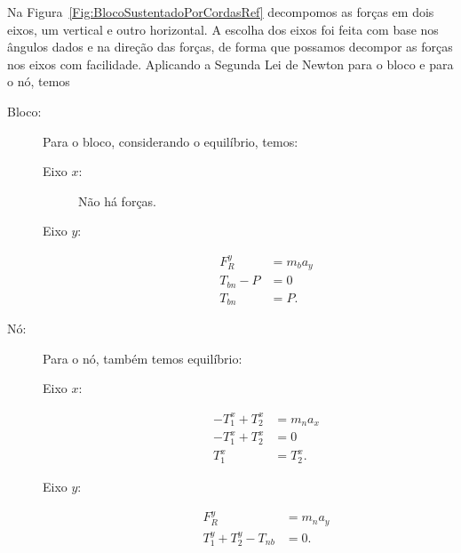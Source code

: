 Na Figura~\ref{Fig:BlocoSustentadoPorCordasRef} decompomos as forças em dois eixos, um vertical e outro horizontal. A escolha dos eixos foi feita com base nos ângulos dados e na direção das forças, de forma que possamos decompor as forças nos eixos com facilidade. Aplicando a Segunda Lei de Newton para o bloco e para o nó, temos
\begin{description}
    \item[Bloco:] Para o bloco, considerando o equilíbrio, temos:
        \begin{description}
            \item[Eixo $x$:] Não há forças.
            \item[Eixo $y$:]
                \begin{align}
                    F_R^y &= m_b a_y \\
                    T_{bn} - P &= 0 \\
                    T_{bn} &= P. \label{Eq:BlocoSustentadoPorCordasTbn}
                \end{align}
        \end{description}
    \item[Nó:] Para o nó, também temos equilíbrio:
        \begin{description}
            \item[Eixo $x$:]
                \begin{align}
                    -T_1^x + T_2^x &= m_n a_x \\
                    -T_1^x + T_2^x &= 0 \\
                    T_1^x &= T_2^x.
                \end{align}
            \item[Eixo $y$:]
                \begin{align}
                    F_R^y &= m_n a_y \\
                    T_1^y + T_2^y - T_{nb}&= 0.
                \end{align}
        \end{description}
\end{description}

